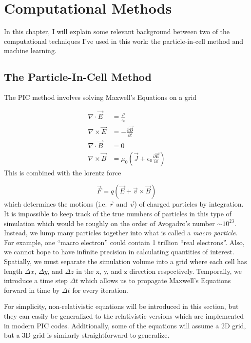 \chapter{Computational Methods} \label{ch:3}

In this chapter, I will explain some relevant background between two of the computational techniques I've used in this work: the particle-in-cell method and machine learning.

\section{The Particle-In-Cell Method}

The \gls{PIC} method involves solving Maxwell's Equations on a grid 

\begin{align}
	\nabla \cdot \vec{E} &= \frac{\rho}{\epsilon_0}  \label{eq:gauss} \\
	\nabla \times \vec{E} &= - \frac{\partial \vec{B}}{\partial t} \label{eq:faraday} \\
	\nabla \cdot \vec{B} &= 0 \label{eq:gauss_magnetism} \\
	\nabla \times \vec{B} &= \mu_0 (\vec{J} + \epsilon_0 \frac{\partial \vec{E}}{\partial t}) \label{eq:ampere}
\end{align}
This is combined with the lorentz force

\begin{equation}
	\vec{F} = q(\vec{E} + \vec{v} \times \vec{B}) \label{eq:lorentz_pic}
\end{equation}
which determines the motions (i.e. $\vec{r}$ and $\vec{v}$) of charged particles by integration. It is impossible to keep track of the true numbers of particles in this type of simulation which would be roughly on the order of Avogadro's number $\sim 10^{23}$. Instead, we lump many particles together into what is called a \emph{macro particle}. For example, one ``macro electron'' could contain 1 trillion ``real electrons''. Also, we cannot hope to have infinite precision in calculating quantities of interest. Spatially, we must separate the simulation volume into a grid where each cell has length $\Delta x$, $\Delta y$, and $\Delta z$ in the x, y, and z direction respectively. Temporally, we introduce a time step $\Delta t$ which allows us to propagate Maxwell's Equations forward in time by $\Delta t$ for every iteration.

For simplicity, non-relativistic equations will be introduced in this section, but they can easily be generalized to the relativistic versions which are implemented in modern PIC codes. Additionally, some of the equations will assume a 2D grid, but a 3D grid is similarly straightforward to generalize.

